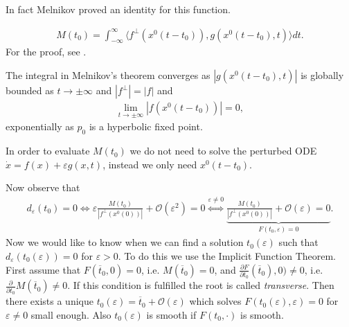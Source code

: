 In fact Melnikov proved an identity for this function.
\begin{theorem}[Melnikov]
	\begin{align}
		M(t_0) = \int_{-\infty }^{\infty }  \langle f^{\perp}(x^{0}(t-t_0)), g(x^{0}(t-t_0),t)\rangle dt.
	\end{align}
	For the proof, see \cite{GuckenheimerHolmes}.	
\end{theorem}
\begin{remark}[]
	The integral in Melnikov's theorem converges as $|g(x^{0}(t-t_0),t)|$ is globally bounded as $t \to \pm \infty $ and $|f^{\perp}| = |f|$ and
	\begin{align}
		\lim_{t\to \pm \infty }\left| f(x^{0}(t-t_0)) \right| =0,
	\end{align}
	exponentially as $p_0$ is a hyperbolic fixed point.	
\end{remark}

\begin{remark}[]
	In order to evaluate $M(t_0)$ we do not need to solve the perturbed ODE $\dot{x} =f(x) + \varepsilon g(x,t)$, instead we only need $x^{0}(t-t_0)$.
\end{remark}

Now observe that
\begin{align}
	d_{\varepsilon} (t_0) = 0 \iff \varepsilon \frac{M(t_0)}{\left| f^{\perp}(x^{0}(0))\right|} + \mathcal{O}(\varepsilon^2) = 0 \overset{\varepsilon \neq 0}{\iff} \underbrace{\frac{M(t_0)}{\left| f^{\perp}(x^{0}(0)) \right|} + \mathcal{O}(\varepsilon)=0}_{F(t_0, \varepsilon) = 0}.
\end{align}
Now we would like to know when we can find a solution $t_0(\varepsilon)$ such that $d_{\varepsilon}(t_0(\varepsilon))=0$ for $\varepsilon > 0$. To do this we use the Implicit Function Theorem. First assume that $F(\overline{t}_{0}, 0) = 0$, i.e. $M(\overline{t}_0) = 0$, and $\frac{\partial F}{\partial t_0}(\overline{t}_0), 0) \neq 0$, i.e. $\frac{\partial }{\partial t_0}M(\overline{t}_0) \neq 0$. If this condition is fulfilled the root is called \emph{transverse}.  Then there exists a unique $t_0(\varepsilon) = \overline{t}_{0} + \mathcal{O}(\varepsilon)$ which solves $F(t_0(\varepsilon), \varepsilon)=0$ for $\varepsilon \neq 0$ small enough. Also $t_0(\varepsilon)$ is smooth if $F(t_0,\cdot)$ is smooth.

